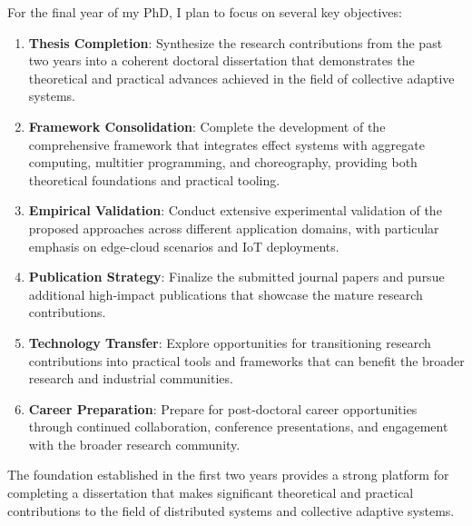 \documentclass[runningheads]{llncs}
\begin{document}
For the final year of my PhD, I plan to focus on several key objectives:

\begin{enumerate}
\item \textbf{Thesis Completion}: Synthesize the research contributions from the past two years into a coherent doctoral dissertation that demonstrates the theoretical and practical advances achieved in the field of collective adaptive systems.

\item \textbf{Framework Consolidation}: Complete the development of the comprehensive framework that integrates effect systems with aggregate computing, multitier programming, and choreography, providing both theoretical foundations and practical tooling.

\item \textbf{Empirical Validation}: Conduct extensive experimental validation of the proposed approaches across different application domains, with particular emphasis on edge-cloud scenarios and IoT deployments.

\item \textbf{Publication Strategy}: Finalize the submitted journal papers and pursue additional high-impact publications that showcase the mature research contributions.

\item \textbf{Technology Transfer}: Explore opportunities for transitioning research contributions into practical tools and frameworks that can benefit the broader research and industrial communities.

\item \textbf{Career Preparation}: Prepare for post-doctoral career opportunities through continued collaboration, conference presentations, and engagement with the broader research community.
\end{enumerate}

The foundation established in the first two years provides a strong platform for completing a dissertation that makes significant theoretical and practical contributions to the field of distributed systems and collective adaptive systems.
\end{document}
